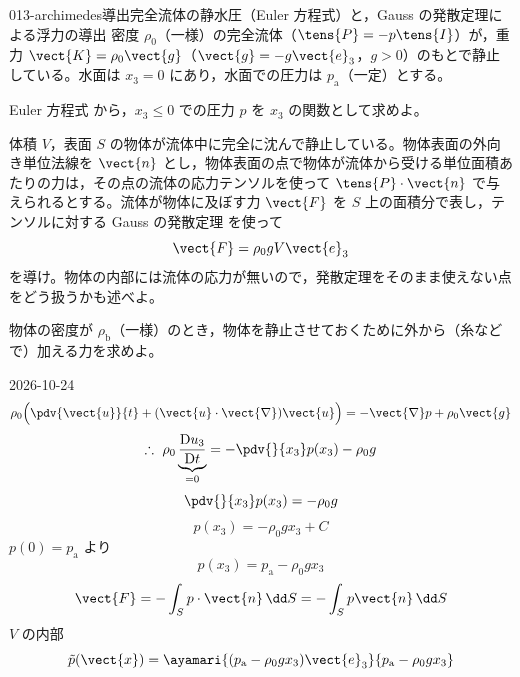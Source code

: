 \documentclass[uplatex,dvipdfmx,a4paper,11pt]{jsarticle}
\begin{document}
\begin{mondai}{013-archimedes}{導出}{完全流体の静水圧（Euler 方程式）と，Gauss の発散定理による浮力の導出}
密度 $\rho_0$（一様）の完全流体（$\tens{P}=-p\tens{I}$）が，重力 $\vect{K}=\rho_0\vect{g}$（$\vect{g}=-g\vect{e}_3$，$g>0$）のもとで静止している。水面は $x_3=0$ にあり，水面での圧力は $p_{\mathrm{a}}$（一定）とする。
\begin{shoumon}
  \item Euler 方程式  から，$x_3\le0$ での圧力 $p$ を $x_3$ の関数として求めよ。
  \item 体積 $V$，表面 $S$ の物体が流体中に完全に沈んで静止している。物体表面の外向き単位法線を $\vect{n}$ とし，物体表面の点で物体が流体から受ける単位面積あたりの力は，その点の流体の応力テンソルを使って $\tens{P}\cdot\vect{n}$ で与えられるとする。流体が物体に及ぼす力 $\vect{F}$ を $S$ 上の面積分で表し，テンソルに対する Gauss の発散定理  を使って
  \[ \vect{F}=\rho_0gV\vect{e}_3 \]
  を導け。物体の内部には流体の応力が無いので，発散定理をそのまま使えない点をどう扱うかも述べよ。
  \item 物体の密度が $\rho_{\mathrm{b}}$（一様）のとき，物体を静止させておくために外から（糸などで）加える力を求めよ。
\end{shoumon}
\begin{kotaeutsushi}{2026-10-24}
\[ \rho_{0}\Bigl(\pdv{\vect{u}}{t}+(\vect{u}\cdot\vect{\nabla})\vect{u}\Bigr)=-\vect{\nabla}p+\rho_{0}\vect{g} \]
\[ \therefore\ \rho_{0}\underbrace{\frac{\mathrm{D}u_{3}}{\mathrm{D}t}}_{=0}=-\pdv{}{x_{3}}p(x_{3})-\rho_{0}g \]
\[ \pdv{}{x_{3}}p(x_{3})=-\rho_{0}g \]
\[ p(x_{3})=-\rho_{0}gx_{3}+C \]
$p(0)=p_{\mathrm{a}}$ より
\[ p(x_{3})=p_{\mathrm{a}}-\rho_{0}gx_{3} \]
\[ \vect{F}=-\int_{S}p\cdot\vect{n}\,\dd S=-\int_{S}p\vect{n}\,\dd S \]
$V$ の内部
\[ \tilde{p}(\vect{x})=\ayamari{(p_{\mathrm{a}}-\rho_{0}gx_{3})\vect{e}_{3}}{p_{\mathrm{a}}-\rho_{0}gx_{3}} \]

\end{kotaeutsushi}
\end{mondai}
\end{document}
